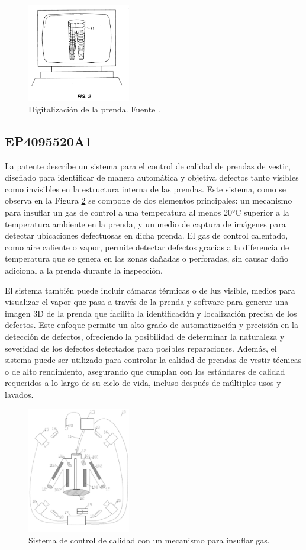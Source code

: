\begin{figure}[H]
	\centering
	\includegraphics[width=0.4\textwidth]{img/US5530652-drawings-page-5.png}
	\caption[Digitalización de la prenda.]{Digitalización de la prenda. Fuente \cite{US5530652A}.}
	\label{fig:US5530652-5}
\end{figure}

\subsection{EP4095520A1}

La patente \cite{EP4095520A1} describe un sistema para el control de calidad de prendas de vestir, diseñado para identificar de manera automática y objetiva defectos tanto visibles como invisibles en la estructura interna de las prendas. Este sistema, como se observa en la Figura \ref{fig:imgf0001} se compone de dos elementos principales: un mecanismo para insuflar un gas de control a una temperatura al menos 20°C superior a la temperatura ambiente en la prenda, y un medio de captura de imágenes para detectar ubicaciones defectuosas en dicha prenda. El gas de control calentado, como aire caliente o vapor, permite detectar defectos gracias a la diferencia de temperatura que se genera en las zonas dañadas o perforadas, sin causar daño adicional a la prenda durante la inspección.

El sistema también puede incluir cámaras térmicas o de luz visible, medios para visualizar el vapor que pasa a través de la prenda y software para generar una imagen 3D de la prenda que facilita la identificación y localización precisa de los defectos. Este enfoque permite un alto grado de automatización y precisión en la detección de defectos, ofreciendo la posibilidad de determinar la naturaleza y severidad de los defectos detectados para posibles reparaciones. Además, el sistema puede ser utilizado para controlar la calidad de prendas de vestir técnicas o de alto rendimiento, asegurando que cumplan con los estándares de calidad requeridos a lo largo de su ciclo de vida, incluso después de múltiples usos y lavados.

\begin{figure}[H]
	\centering
	\includegraphics[width=0.4\textwidth]{img/imgf0001.png}
	\caption{Sistema de control de calidad con un mecanismo para insuflar gas.}
	\label{fig:imgf0001}
\end{figure}

